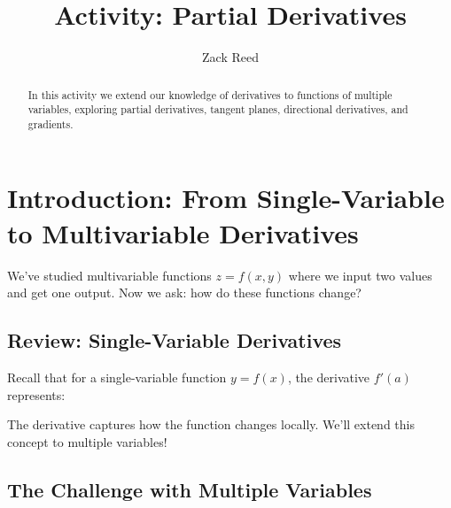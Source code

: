 \documentclass{ximera}
\title{Activity: Partial Derivatives}
\author{Zack Reed}
\begin{document}
\begin{abstract}
In this activity we extend our knowledge of derivatives to functions of multiple variables, exploring partial derivatives, tangent planes, directional derivatives, and gradients.
\end{abstract}
\maketitle

\section*{Introduction: From Single-Variable to Multivariable Derivatives}

We've studied multivariable functions $z = f(x, y)$ where we input two values and get one output. Now we ask: how do these functions change?

\subsection*{Review: Single-Variable Derivatives}

\begin{problem}
Recall that for a single-variable function $y = f(x)$, the derivative $f'(a)$ represents:

\begin{selectAll}
\end{selectAll}

\begin{feedback}
The derivative captures how the function changes locally. We'll extend this concept to multiple variables!
\end{feedback}
\end{problem}

\subsection*{The Challenge with Multiple Variables}
\end{document}
